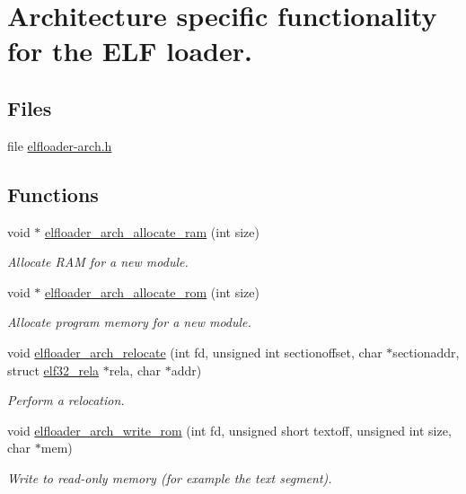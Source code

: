 \hypertarget{group__elfloaderarch}{}\section{Architecture specific functionality for the E\+L\+F loader.}
\label{group__elfloaderarch}
\subsection*{Files}
\begin{DoxyCompactItemize}
\item 
file \hyperlink{elfloader-arch_8h}{elfloader-\/arch.\+h}
\end{DoxyCompactItemize}
\subsection*{Functions}
\begin{DoxyCompactItemize}
\item 
void $\ast$ \hyperlink{group__elfloaderarch_ga1583b48c655f508d845d1a22bd54d2a3}{elfloader\+\_\+arch\+\_\+allocate\+\_\+ram} (int size)
\begin{DoxyCompactList}\small\item\em Allocate R\+A\+M for a new module. \end{DoxyCompactList}\item 
void $\ast$ \hyperlink{group__elfloaderarch_gabf03ff0788cfecc08e82ec0fc3bff6f7}{elfloader\+\_\+arch\+\_\+allocate\+\_\+rom} (int size)
\begin{DoxyCompactList}\small\item\em Allocate program memory for a new module. \end{DoxyCompactList}\item 
void \hyperlink{group__elfloaderarch_gab20475a2c29caa2906b860368895944b}{elfloader\+\_\+arch\+\_\+relocate} (int fd, unsigned int sectionoffset, char $\ast$sectionaddr, struct \hyperlink{structelf32__rela}{elf32\+\_\+rela} $\ast$rela, char $\ast$addr)
\begin{DoxyCompactList}\small\item\em Perform a relocation. \end{DoxyCompactList}\item 
void \hyperlink{group__elfloaderarch_ga83a40c77924d5791d8ec67f3465a99de}{elfloader\+\_\+arch\+\_\+write\+\_\+rom} (int fd, unsigned short textoff, unsigned int size, char $\ast$mem)
\begin{DoxyCompactList}\small\item\em Write to read-\/only memory (for example the text segment). \end{DoxyCompactList}\end{DoxyCompactItemize}


